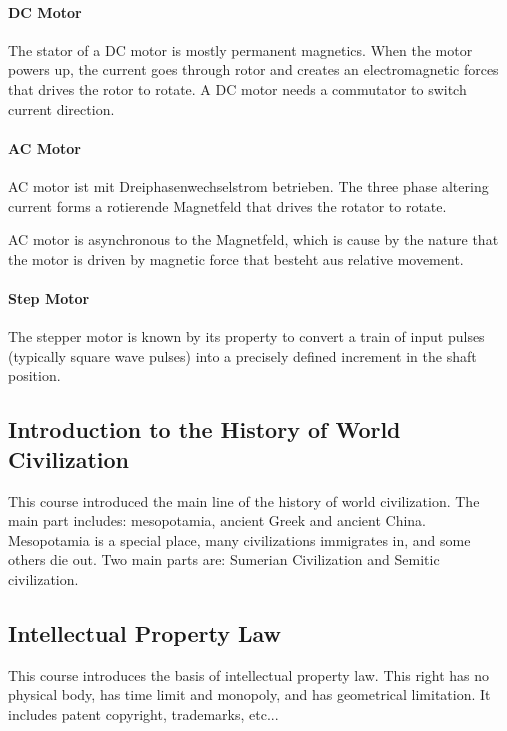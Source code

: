 \paragraph{DC Motor} The stator of a DC motor is mostly permanent magnetics. When the motor powers up, the current goes through rotor and creates an electromagnetic forces that drives the rotor to rotate. A DC motor needs a commutator to switch current direction.

\paragraph{AC Motor} AC motor ist mit Dreiphasenwechselstrom betrieben. The three phase altering current forms a rotierende Magnetfeld that drives the rotator to rotate.

AC motor is asynchronous to the Magnetfeld, which is cause by the nature that the motor is driven by magnetic force that besteht aus relative movement.

\paragraph{Step Motor} The stepper motor is known by its property to convert a train of input pulses (typically square wave pulses) into a precisely defined increment in the shaft position. \subsection{Introduction to the History of World Civilization}
This course introduced the main line of the history of world civilization. The main part includes: mesopotamia, ancient Greek and ancient China. Mesopotamia is a special place, many civilizations immigrates in, and some others die out. Two main parts are: Sumerian Civilization and Semitic civilization.

\subsection{Intellectual Property Law}
This course introduces the basis of intellectual property law. This right has no physical body, has time limit and monopoly, and has geometrical limitation. It includes patent copyright, trademarks, etc... 